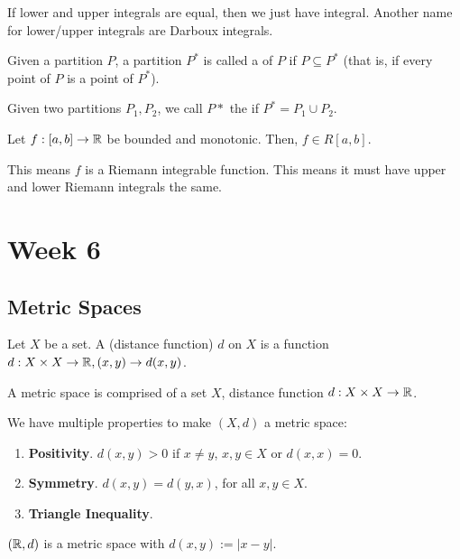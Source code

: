 \documentclass{book}
\begin{document}
If lower and upper integrals are equal, then we just have integral. Another name for lower/upper integrals are Darboux integrals.

\begin{defn}
    Given a partition $P$, a partition $P^*$ is called a  of $P$ if $P \subseteq P^*$ (that is, if every point of $P$ is a point of $P^*$). 
\end{defn}

Given two partitions $P_1, P_2$, we call $P*$ the  if $P^* = P_1 \cup P_2$.

\begin{thm}
    Let $f: [a, b] \to \mathbb{R}$ be bounded and monotonic. Then, $f \in R[a, b]$.

    This means $f$ is a Riemann integrable function. This means it must have upper and lower Riemann integrals the same.
\end{thm}

\chapter{Week 6}
\section{Metric Spaces}
\begin{defn} Let $X$ be a set. A  (distance function) $d$ on $X$ is a function $d : X \times X \to \mathbb{R}, (x, y) \to d(x, y)$.
\end{defn}

\begin{defn}
    A metric space is comprised of a set $X$, distance function $d : X \times X \to \mathbb{R}$.

    We have multiple properties to make $(X, d)$ a metric space:
    \begin{enumerate}
        \item \textbf{Positivity}. $d(x, y) > 0$ if $x \neq y$, $x, y \in X$ or $d(x, x) = 0$.
        \item \textbf{Symmetry}. $d(x, y) = d(y, x)$, for all $x, y \in X$.
        \item \textbf{Triangle Inequality}.
    \end{enumerate}
\end{defn}

\begin{ex}
    $(\mathbb{R}, d)$ is a metric space with $d(x, y) := |x - y|$. 
\end{ex}
\end{document}
